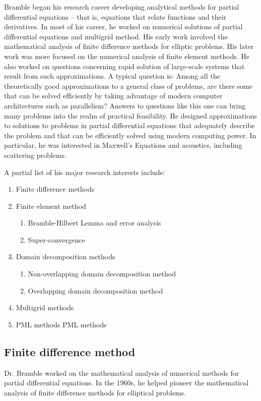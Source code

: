 \documentclass[CJK,11pt]{amsart}
\theoremstyle{definition}
\begin{document}
\begin{CJK*}{UTF8}{gbsn}
Bramble began his research career developing analytical methods for
partial differential equations -- that is, equations that relate
functions and their derivatives.  In most of his career, he worked on
numerical solutions of partial differential equations and multigrid
method. His early work involved the mathematical analysis of finite
difference methods for elliptic problems. His later work was more
focused on the numerical analysis of finite element methods.  He also
worked on questions concerning rapid solution of large-scale systems
that result from such approximations. A typical question is: Among all
the theoretically good approximations to a general class of problems,
are there some that can be solved efficiently by taking advantage of
modern computer architectures such as parallelism? Answers to
questions like this one can bring many problems into the realm of
practical feasibility. He designed approximations to solutions to
problems in partial differential equations that adequately describe
the problem and that can be efficiently solved using modern computing
power. In particular, he was interested in Maxwell's Equations and acoustics,
including scattering problems.

A partial list of his major research interests include:
\begin{enumerate}
\item Finite difference methods
\item Finite element method
\begin{enumerate}
\item Bramble-Hilbert Lemma and error analysis
\item Super-convergence
\end{enumerate}
\item Domain decomposition methods 
\begin{enumerate}
\item Non-overlapping domain decomposition method
\item Overlapping domain decomposition method
  \end{enumerate}
\item Multigrid methods 
\item PML methods {\color{red} PML methods}
\end{enumerate}
\subsection{Finite difference method}
Dr. Bramble worked on the mathematical analysis of numerical methods
for partial differential equations. In the 1960s, he helped pioneer
the mathematical analysis of finite difference methods for elliptical
problems.


\end{CJK*}
\end{document}
